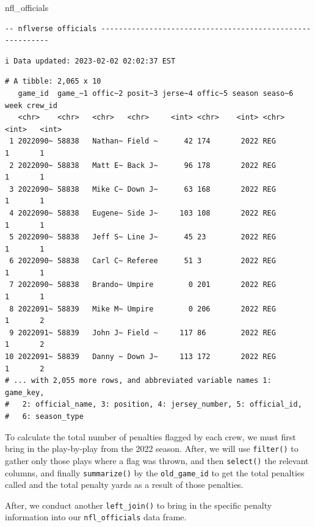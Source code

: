 \documentclass[
  letterpaper,
]{krantz}
\newenvironment{Shaded}{\begin{snugshade}}{\end{snugshade}}
\newcommand{\NormalTok}[1]{\textcolor[rgb]{0.00,0.23,0.31}{#1}}
\begin{document}
\begin{Shaded}
\begin{Highlighting}[]
\NormalTok{nfl\_officials}
\end{Highlighting}
\end{Shaded}

\begin{verbatim}
-- nflverse officials ----------------------------------------------------------
\end{verbatim}

\begin{verbatim}
i Data updated: 2023-02-02 02:02:37 EST
\end{verbatim}

\begin{verbatim}
# A tibble: 2,065 x 10
   game_id  game_~1 offic~2 posit~3 jerse~4 offic~5 season seaso~6  week crew_id
   <chr>    <chr>   <chr>   <chr>     <int> <chr>    <int> <chr>   <int>   <int>
 1 2022090~ 58838   Nathan~ Field ~      42 174       2022 REG         1       1
 2 2022090~ 58838   Matt E~ Back J~      96 178       2022 REG         1       1
 3 2022090~ 58838   Mike C~ Down J~      63 168       2022 REG         1       1
 4 2022090~ 58838   Eugene~ Side J~     103 108       2022 REG         1       1
 5 2022090~ 58838   Jeff S~ Line J~      45 23        2022 REG         1       1
 6 2022090~ 58838   Carl C~ Referee      51 3         2022 REG         1       1
 7 2022090~ 58838   Brando~ Umpire        0 201       2022 REG         1       1
 8 2022091~ 58839   Mike M~ Umpire        0 206       2022 REG         1       2
 9 2022091~ 58839   John J~ Field ~     117 86        2022 REG         1       2
10 2022091~ 58839   Danny ~ Down J~     113 172       2022 REG         1       2
# ... with 2,055 more rows, and abbreviated variable names 1: game_key,
#   2: official_name, 3: position, 4: jersey_number, 5: official_id,
#   6: season_type
\end{verbatim}

To calculate the total number of penalties flagged by each crew, we must
first bring in the play-by-play from the 2022 season. After, we will use
\texttt{filter()} to gather only those plays where a flag was thrown,
and then \texttt{select()} the relevant columns, and finally
\texttt{summarize()} by the \texttt{old\_game\_id} to get the total
penalties called and the total penalty yards as a result of those
penalties.

After, we conduct another \texttt{left\_join()} to bring in the specific
penalty information into our \texttt{nfl\_officials} data frame.
\end{document}
